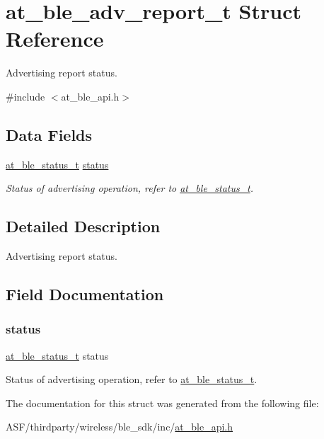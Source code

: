 \hypertarget{structat__ble__adv__report__t}{}\section{at\+\_\+ble\+\_\+adv\+\_\+report\+\_\+t Struct Reference}
\label{structat__ble__adv__report__t}


Advertising report status.  




{\ttfamily \#include $<$at\+\_\+ble\+\_\+api.\+h$>$}

\subsection*{Data Fields}
\begin{DoxyCompactItemize}
\item 
\mbox{\hyperlink{group__error__codes__group_ga3b1db9b95feb157b3c188ca27fe76988}{at\+\_\+ble\+\_\+status\+\_\+t}} \mbox{\hyperlink{structat__ble__adv__report__t_a0b48093fc2030779fc47e5216f8019e2}{status}}
\begin{DoxyCompactList}\small\item\em Status of advertising operation, refer to \mbox{\hyperlink{at__ble__api_8h_ace24eb4e5ca3f325c663b809da5feb92}{at\+\_\+ble\+\_\+status\+\_\+t}}. \end{DoxyCompactList}\end{DoxyCompactItemize}


\subsection{Detailed Description}
Advertising report status. 

\subsection{Field Documentation}
\mbox{\label{structat__ble__adv__report__t_a0b48093fc2030779fc47e5216f8019e2}} 
\subsubsection{\texorpdfstring{status}{status}}
{\footnotesize\ttfamily \mbox{\hyperlink{group__error__codes__group_ga3b1db9b95feb157b3c188ca27fe76988}{at\+\_\+ble\+\_\+status\+\_\+t}} status}



Status of advertising operation, refer to \mbox{\hyperlink{at__ble__api_8h_ace24eb4e5ca3f325c663b809da5feb92}{at\+\_\+ble\+\_\+status\+\_\+t}}. 



The documentation for this struct was generated from the following file\+:\begin{DoxyCompactItemize}
\item 
A\+S\+F/thirdparty/wireless/ble\+\_\+sdk/inc/\mbox{\hyperlink{at__ble__api_8h}{at\+\_\+ble\+\_\+api.\+h}}\end{DoxyCompactItemize}
